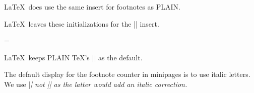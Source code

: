 \begin{macro}{\@endfloatbox}
\begin{teX}
\begin{oldcomments}
 \begin{macro}{\footins}
 \LaTeX\ does use the same insert for footnotes as PLAIN.
    \begin{teX}
\newinsert\footins
    \end{teX}

 \LaTeX\ leaves these initializations for the |\footins| insert.

    \begin{teX}
\skip\footins=\bigskipamount %
\count{} %
\dimen\footins=8in %
    \end{teX}
 \end{macro}


 \begin{macro}{\footnoterule}
 \LaTeX\ keeps PLAIN \TeX's |\footnoterule| as the default.

    \begin{teX}
\def\footnoterule{\kern-3\p@
  \hrule \@width 2in \kern 2.6\p@} %
    \end{teX}
 \end{macro}

 \begin{macro}{\thefootnote}
    \begin{teX}
\def\thefootnote{\@arabic\c@footnote}
    \end{teX}
 \end{macro}

 \begin{macro}{\thempfootnote}
    The default display for the footnote counter in minipages is to
    use italic letters. We use |\itshape| not |\textit| as the latter
    would add an italic correction.
    \begin{teX}
\def\thempfootnote{{\itshape\@alph\c@mpfootnote}}
    \end{teX}
 \end{macro}

 \begin{macro}{\@makefnmark}
    \begin{teX}
\def\@makefnmark{\hbox{$^{\@thefnmark}\m@th$}}
\def\@makefnmark{\hbox{\@textsuperscript{\normalfont\@thefnmark}}}
    \end{teX}
 \end{macro}



\end{oldcomments}
\end{teX}
\end{macro}
